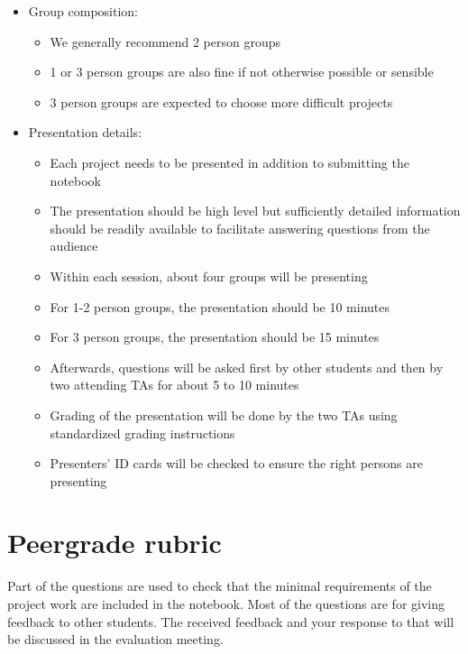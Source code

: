 \documentclass[a4paper,11pt]{article}
\begin{document}
\begin{itemize}[noitemsep,topsep=0pt]
\item Group composition:
\begin{itemize}
  \item We generally recommend 2 person groups
  \item 1 or 3 person groups are also fine if not otherwise possible or sensible
  \item 3 person groups are expected to choose more difficult projects
\end{itemize}

\item Presentation details:
\begin{itemize}
  \item Each project needs to be presented in addition to submitting the notebook
  \item The presentation should be high level but sufficiently detailed information should be readily available to facilitate answering questions from the audience
  \item Within each session, about four groups will be presenting
  \item For 1-2 person groups, the presentation should be 10 minutes
  \item For 3 person groups, the presentation should be 15 minutes 
  \item Afterwards, questions will be asked first by other students and then by two attending TAs for about 5 to 10 minutes
  \item Grading of the presentation will be done by the two TAs using standardized grading instructions
  \item Presenters' ID cards will be checked to ensure the right persons are presenting
\end{itemize}

\end{itemize}

\section*{Peergrade rubric}

Part of the questions are used to check that the minimal requirements
of the project work are included in the notebook. Most of the questions are for giving
feedback to other students. The received feedback and your response to
that will be discussed in the evaluation meeting.
\end{document}
